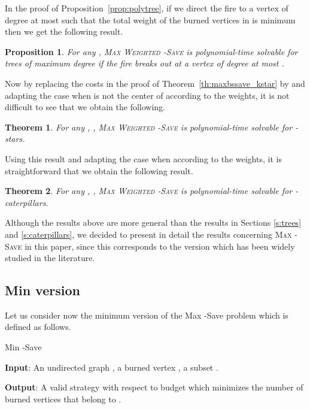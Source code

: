 \documentclass[10pt]{article}
\newcommand{\probtitle}[1]{\textsc{#1}}
\newtheorem{theorem}{Theorem}
\newtheorem{proposition}{Proposition}
\begin{document}
\medskip

In the proof of Proposition~\ref{prop:polytree}, if we direct the fire to a vertex of degree at most  such that the total weight of the burned vertices in  is minimum then we get the following result.

\begin{proposition}
For any , \probtitle{Max Weighted -Save} is polynomial-time solvable for trees of maximum degree  if the fire breaks out at a vertex of degree at most .
\end{proposition}

Now by replacing the costs  in the proof of Theorem~\ref{th:maxbssave_kstar} by  and adapting the case when  is not the center of  according to the weights, it is not difficult to see that we obtain the following.

\begin{theorem}
For any , , \probtitle{Max Weighted -Save} is polynomial-time solvable for -stars.
\end{theorem}

Using this result and adapting the case when  according to the weights, it is straightforward that we obtain the following result.

\begin{theorem}
For any , , \probtitle{Max Weighted -Save} is polynomial-time solvable for -caterpillars.
\end{theorem}

Although the results above are more general than the results in Sections \ref{s:trees} and \ref{s:caterpillars}, we decided to present in detail the results concerning \probtitle{Max -Save} in this paper, since this corresponds to the version which has been widely studied in the literature.

\subsection{Min version}

Let us consider now the minimum version of the {\sc Max -Save} problem which is defined as follows. 

\medskip

\noindent 
{\sc Min -Save}

\noindent\textbf{Input}: An undirected graph , a burned vertex , a subset .

\noindent\textbf{Output}: A valid strategy  with respect to budget  which minimizes the number of burned vertices that belong to .\\
\end{document}

